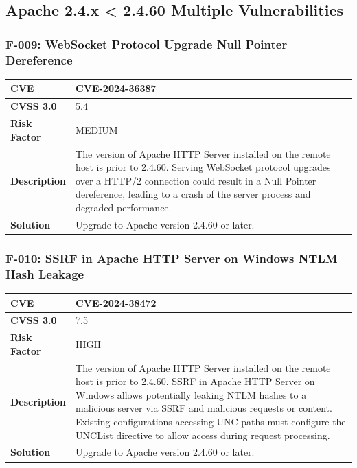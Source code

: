 %
%
\subsection{Apache 2.4.x < 2.4.60 Multiple Vulnerabilities}

\subsubsection{F-009: WebSocket Protocol Upgrade Null Pointer Dereference}
\begin{tabular}{|p{2.8cm}|p{12.2cm}|}
\hline
\textbf{CVE} & CVE-2024-36387 \\ \hline
\textbf{CVSS 3.0} & 5.4 \\ \hline
\textbf{Risk Factor} & MEDIUM \\ \hline
\textbf{Description} & The version of Apache HTTP Server installed on the remote host is prior to 2.4.60. Serving WebSocket protocol upgrades over a HTTP/2 connection could result in a Null Pointer dereference, leading to a crash of the server process and degraded performance. \\ \hline
\textbf{Solution} & Upgrade to Apache version 2.4.60 or later. \\ \hline
\end{tabular}

\subsubsection{F-010: SSRF in Apache HTTP Server on Windows NTLM Hash Leakage}
\begin{tabular}{|p{2.8cm}|p{12.2cm}|}
\hline
\textbf{CVE} & CVE-2024-38472 \\ \hline
\textbf{CVSS 3.0} & 7.5 \\ \hline
\textbf{Risk Factor} & HIGH \\ \hline
\textbf{Description} & The version of Apache HTTP Server installed on the remote host is prior to 2.4.60. SSRF in Apache HTTP Server on Windows allows potentially leaking NTLM hashes to a malicious server via SSRF and malicious requests or content. Existing configurations accessing UNC paths must configure the UNCList directive to allow access during request processing. \\ \hline
\textbf{Solution} & Upgrade to Apache version 2.4.60 or later. \\ \hline
\end{tabular}

